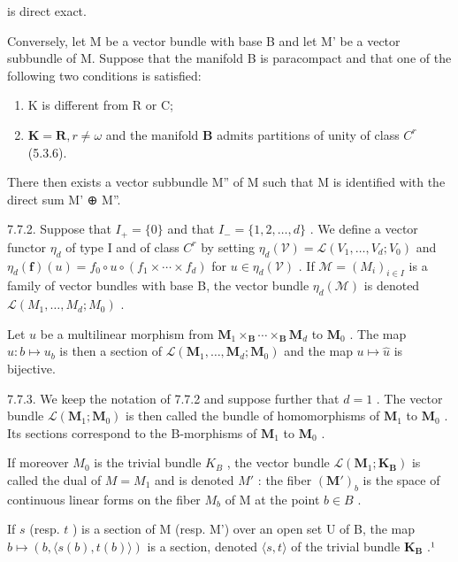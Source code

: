 is direct exact.

Conversely, let M be a vector bundle with base B and let M' be a vector subbundle of M. Suppose that the manifold B is paracompact and that one of the following two conditions is satisfied:

\begin{enumerate}
\def\labelenumi{(\roman{enumi})}
\item
  K is different from R or C;
\item
  \(\mathbf{K} = \mathbf{R}, r \neq \omega\) and the manifold \(\mathbf{B}\) admits partitions of unity of class \(C^r\) (5.3.6).
\end{enumerate}

There then exists a vector subbundle M'' of M such that M is identified with the direct sum M' ⊕ M''.

7.7.2. Suppose that \(I_{+}=\{0\}\) and that \(I_{-}=\{1,2,\ldots,d\}\) . We define a vector functor \(\eta_{d}\) of type I and of class \(C^{r}\) by setting \(\eta_{d}(\mathcal{V})=\mathcal{L}(V_{1},\ldots,V_{d};V_{0})\) and \(\eta_{d}(\mathbf{f})(u)=f_{0}\circ u\circ(f_{1}\times\cdots\times f_{d})\) for \(u\in\eta_{d}(\mathcal{V})\) . If \(\mathcal{M}=(M_{i})_{i\in I}\) is a family of vector bundles with base B, the vector bundle \(\eta_{d}(\mathcal{M})\) is denoted \(\mathcal{L}(M_{1},\ldots,M_{d};M_{0})\) .

Let \(u\) be a multilinear morphism from \(\mathbf{M}_{1} \times_{\mathbf{B}} \cdots \times_{\mathbf{B}} \mathbf{M}_{d}\) to \(\mathbf{M}_{0}\) . The map \(\hat{u}: b \mapsto u_{b}\) is then a section of \(\mathcal{L}(\mathbf{M}_{1}, \ldots, \mathbf{M}_{d}; \mathbf{M}_{0})\) and the map \(u \mapsto \hat{u}\) is bijective.

7.7.3. We keep the notation of 7.7.2 and suppose further that \(d=1\) . The vector bundle \(\mathcal{L}(\mathbf{M}_{1};\mathbf{M}_{0})\) is then called the bundle of homomorphisms of \(\mathbf{M}_{1}\) to \(\mathbf{M}_{0}\) . Its sections correspond to the B-morphisms of \(\mathbf{M}_{1}\) to \(\mathbf{M}_{0}\) .

If moreover \(M_{0}\) is the trivial bundle \(K_{B}\) , the vector bundle \(\mathcal{L}(\mathbf{M}_{1};\mathbf{K}_{\mathbf{B}})\) is called the dual of \(M = M_{1}\) and is denoted \(M'\) : the fiber \((\mathbf{M}')_{b}\) is the space of continuous linear forms on the fiber \(M_{b}\) of M at the point \(b \in B\) .

If \(s\) (resp. \(t\) ) is a section of M (resp. M') over an open set U of B, the map \(b \mapsto (b, \langle s(b), t(b) \rangle)\) is a section, denoted \(\langle s, t \rangle\) of the trivial bundle \(\mathbf{K}_{\mathbf{B}}\) .¹

